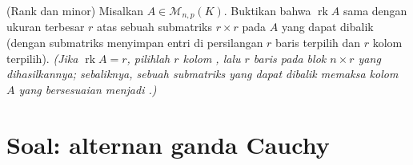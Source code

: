 \begin{exercise}[$\star\star\star$]\label{exo:b1:det:12}
(Rank dan minor) Misalkan $A \in \mathcal{M}_{n,p}(K)$. Buktikan bahwa
$\operatorname{rk} A$ sama dengan ukuran terbesar $r$ atas sebuah
submatriks $r \times r$ pada $A$ yang dapat dibalik (dengan submatriks menyimpan
entri di persilangan $r$ baris terpilih dan $r$ kolom
terpilih). \emph{(Jika $\operatorname{rk} A = r$, pilihlah $r$ kolom
, lalu $r$ baris  pada blok $n \times r$ yang dihasilkannya;
sebaliknya, sebuah submatriks yang dapat dibalik memaksa kolom
$A$ yang bersesuaian menjadi .)}
\end{exercise}

\section{Soal: alternan ganda Cauchy}

